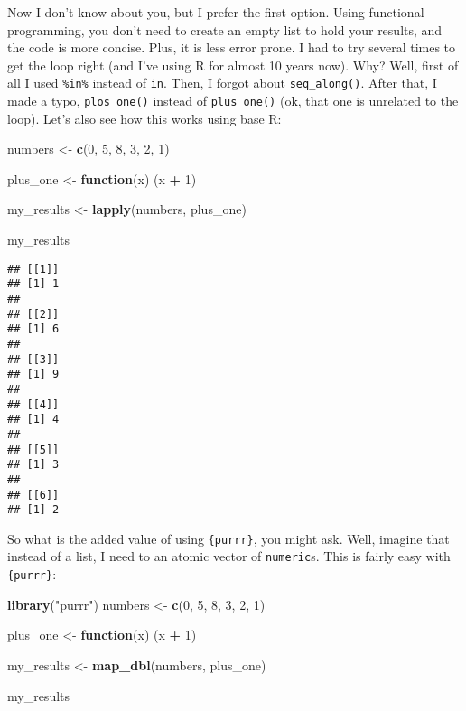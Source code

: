 \documentclass[
]{article}
\newenvironment{Shaded}{\begin{snugshade}}{\end{snugshade}}
\newcommand{\ControlFlowTok}[1]{\textcolor[rgb]{0.13,0.29,0.53}{\textbf{#1}}}
\newcommand{\DecValTok}[1]{\textcolor[rgb]{0.00,0.00,0.81}{#1}}
\newcommand{\KeywordTok}[1]{\textcolor[rgb]{0.13,0.29,0.53}{\textbf{#1}}}
\newcommand{\NormalTok}[1]{#1}
\newcommand{\OperatorTok}[1]{\textcolor[rgb]{0.81,0.36,0.00}{\textbf{#1}}}
\newcommand{\StringTok}[1]{\textcolor[rgb]{0.31,0.60,0.02}{#1}}
\begin{document}
Now I don't know about you, but I prefer the first option. Using functional programming, you don't
need to create an empty list to hold your results, and the code is more concise. Plus,
it is less error prone. I had to try several times to get the loop right
(and I've using R for almost 10 years now). Why? Well, first of all I used \texttt{\%in\%} instead of \texttt{in}.
Then, I forgot about \texttt{seq\_along()}. After that, I made a typo, \texttt{plos\_one()} instead of \texttt{plus\_one()}
(ok, that one is unrelated to the loop). Let's also see how this works using base R:

\begin{Shaded}
\begin{Highlighting}[]
\NormalTok{numbers \textless{}{-}}\StringTok{ }\KeywordTok{c}\NormalTok{(}\DecValTok{0}\NormalTok{, }\DecValTok{5}\NormalTok{, }\DecValTok{8}\NormalTok{, }\DecValTok{3}\NormalTok{, }\DecValTok{2}\NormalTok{, }\DecValTok{1}\NormalTok{)}

\NormalTok{plus\_one \textless{}{-}}\StringTok{ }\ControlFlowTok{function}\NormalTok{(x) (x }\OperatorTok{+}\StringTok{ }\DecValTok{1}\NormalTok{)}

\NormalTok{my\_results \textless{}{-}}\StringTok{ }\KeywordTok{lapply}\NormalTok{(numbers, plus\_one)}

\NormalTok{my\_results}
\end{Highlighting}
\end{Shaded}

\begin{verbatim}
## [[1]]
## [1] 1
## 
## [[2]]
## [1] 6
## 
## [[3]]
## [1] 9
## 
## [[4]]
## [1] 4
## 
## [[5]]
## [1] 3
## 
## [[6]]
## [1] 2
\end{verbatim}

So what is the added value of using \texttt{\{purrr\}}, you might ask. Well, imagine that instead of a list,
I need to an atomic vector of \texttt{numeric}s. This is fairly easy with \texttt{\{purrr\}}:

\begin{Shaded}
\begin{Highlighting}[]
\KeywordTok{library}\NormalTok{(}\StringTok{"purrr"}\NormalTok{)}
\NormalTok{numbers \textless{}{-}}\StringTok{ }\KeywordTok{c}\NormalTok{(}\DecValTok{0}\NormalTok{, }\DecValTok{5}\NormalTok{, }\DecValTok{8}\NormalTok{, }\DecValTok{3}\NormalTok{, }\DecValTok{2}\NormalTok{, }\DecValTok{1}\NormalTok{)}

\NormalTok{plus\_one \textless{}{-}}\StringTok{ }\ControlFlowTok{function}\NormalTok{(x) (x }\OperatorTok{+}\StringTok{ }\DecValTok{1}\NormalTok{)}

\NormalTok{my\_results \textless{}{-}}\StringTok{ }\KeywordTok{map\_dbl}\NormalTok{(numbers, plus\_one)}

\NormalTok{my\_results}
\end{Highlighting}
\end{Shaded}
\end{document}

